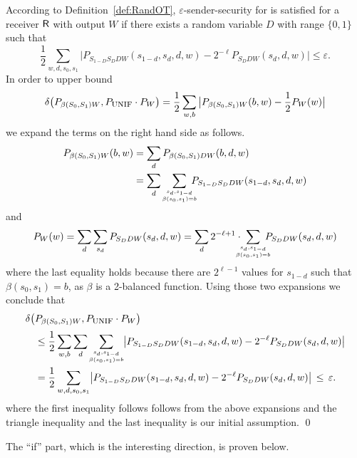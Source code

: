 According to Definition~\ref{def:RandOT}, $\varepsilon$-sender-security for \RandOT is satisfied for a receiver ${\sf R}$ with output $W$ if there
exists a random variable $D$ with range $\{0,1\}$ such that
$$
\frac12 \sum_{w,d,s_0,s_1} \big| P_{S_{1-D}S_D D W}(s_{1-d},s_d,d,w) - 2^{-\ell}
P_{S_D D W}(s_d,d,w) \big| \leq \varepsilon. 
$$
In order to upper bound 
$$
  \delta\big( P_{\beta(S_0,S_1)W},P_{\mbox{\sc unif}} \cdot P_{W} \big) = \frac12 \sum_{w,b}
  \big|P_{\beta(S_0,S_1) W}(b,w) - \frac12 P_W(w) \big| \label{toupperbound}
$$
we expand the terms on the right hand side as follows. 
\begin{align*}                   
P_{\beta(S_0,S_1) W}(b,w) &= \sum_d P_{\beta(S_0,S_1) D W} (b,d,w)\\
 &= \sum_d \!\sum_{{s_d,s_{1-d}}\atop{\beta(s_0,s_1)=b}}\!\!\!\!\! P_{S_{1-D}
  S_D D W} (s_{1-d},s_d,d,w)
\end{align*}
and
$$
P_{W}(w) = \sum_d \sum_{s_d} P_{S_D D W}(s_d,d,w) 
= \sum_d 2^{-\ell+1} \cdot \!\!\!\!\!
\sum_{{s_d,s_{1-d}}\atop{\beta(s_0,s_1)=b}}\!\!\!\!\! P_{S_D D W} (s_d,d,w) 
$$
where the last equality holds because there are $2^{\ell-1}$ values for $s_{1-d}$
such that $\beta(s_0,s_1)=b$, as $\beta$ is a 2-balanced function. 
Using those two expansions we conclude that
\begin{align*}
 \delta\big( &P_{\beta(S_0,S_1) W} , P_{\mbox{\sc unif}} \cdot P_{W} \big) \\[0.5ex]
&\leq \frac12 \sum_{w,b} \sum_{d} \!\sum_{{s_d,s_{1-d}}\atop{\beta(s_0,s_1)=b}}\!\! \big| P_{S_{1-D}
  S_D D W} (s_{1-d},s_d,d,w) - 2^{-\ell} P_{S_D D W} (s_d,d,w)
\big|  \\
&= \frac12 \sum_{w,d,s_0,s_1}\! \big| P_{S_{1-D}S_D D W}(s_{1-d},s_d,d,w) - 2^{-\ell}
P_{S_D D W}(s_d,d,w) \big|  \,\leq\, \varepsilon. 
\end{align*}
where the first inequality follows follows from the above expansions and the triangle inequality and the last inequality is our initial assumption. \qed


The ``if'' part, which is the interesting direction, is proven below. 

